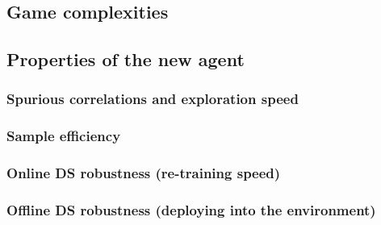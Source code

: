 \documentclass[a4paper,11pt,oneside]{report}
\begin{document}
\subsection{Game complexities}
\subsection{Properties of the new agent}
\subsubsection{Spurious correlations and exploration speed}
\subsubsection{Sample efficiency}
\subsubsection{Online DS robustness (re-training speed)}
\subsubsection{Offline DS robustness (deploying into the environment)}

\cleardoublepage
{}
{}
\printbibliography
\end{document}
